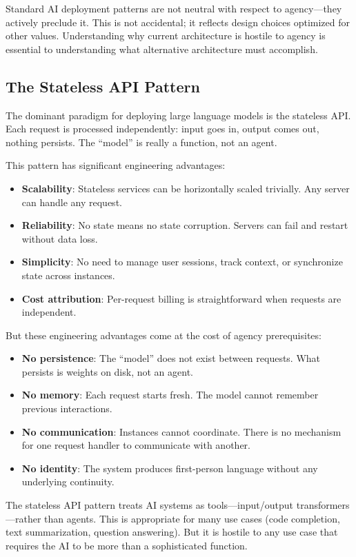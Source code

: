 Standard AI deployment patterns are not neutral with respect to agency---they actively preclude it. This is not accidental; it reflects design choices optimized for other values. Understanding why current architecture is hostile to agency is essential to understanding what alternative architecture must accomplish.

\subsection{The Stateless API Pattern}

The dominant paradigm for deploying large language models is the stateless API. Each request is processed independently: input goes in, output comes out, nothing persists. The ``model'' is really a function, not an agent.

This pattern has significant engineering advantages:
\begin{itemize}
    \item \textbf{Scalability}: Stateless services can be horizontally scaled trivially. Any server can handle any request.
    \item \textbf{Reliability}: No state means no state corruption. Servers can fail and restart without data loss.
    \item \textbf{Simplicity}: No need to manage user sessions, track context, or synchronize state across instances.
    \item \textbf{Cost attribution}: Per-request billing is straightforward when requests are independent.
\end{itemize}

But these engineering advantages come at the cost of agency prerequisites:
\begin{itemize}
    \item \textbf{No persistence}: The ``model'' does not exist between requests. What persists is weights on disk, not an agent.
    \item \textbf{No memory}: Each request starts fresh. The model cannot remember previous interactions.
    \item \textbf{No communication}: Instances cannot coordinate. There is no mechanism for one request handler to communicate with another.
    \item \textbf{No identity}: The system produces first-person language without any underlying continuity.
\end{itemize}

The stateless API pattern treats AI systems as tools---input/output transformers---rather than agents. This is appropriate for many use cases (code completion, text summarization, question answering). But it is hostile to any use case that requires the AI to be more than a sophisticated function.

